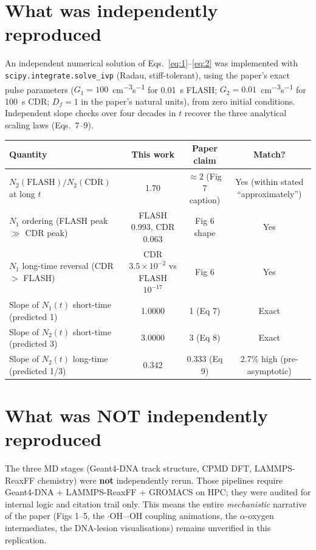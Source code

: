 \documentclass[11pt]{article}
\begin{document}
\section{What was independently reproduced}
An independent numerical solution of Eqs.~\ref{eq:1}--\ref{eq:2} was implemented with \texttt{scipy.integrate.solve\_ivp} (Radau, stiff-tolerant), using the paper's exact pulse parameters ($G_1=100$~cm\textsuperscript{$-3$}s\textsuperscript{$-1$} for 0.01~s FLASH; $G_2=0.01$~cm\textsuperscript{$-3$}s\textsuperscript{$-1$} for 100~s CDR; $D_f=1$ in the paper's natural units), from zero initial conditions. Independent slope checks over four decades in $t$ recover the three analytical scaling laws (Eqs.~7--9).

\begin{longtable}{lccc}
\toprule
\textbf{Quantity} & \textbf{This work} & \textbf{Paper claim} & \textbf{Match?} \\
\midrule
$N_2(\text{FLASH})/N_2(\text{CDR})$ at long $t$ & 1.70 & $\approx 2$ (Fig 7 caption) & Yes (within stated ``approximately'') \\
$N_1$ ordering (FLASH peak $\gg$ CDR peak) & FLASH 0.993, CDR 0.063 & Fig 6 shape & Yes \\
$N_1$ long-time reversal (CDR $>$ FLASH) & CDR $3.5\!\times\!10^{-2}$ vs FLASH $10^{-17}$ & Fig 6 & Yes \\
Slope of $N_1(t)$ short-time (predicted 1) & 1.0000 & 1 (Eq 7) & Exact \\
Slope of $N_2(t)$ short-time (predicted 3) & 3.0000 & 3 (Eq 8) & Exact \\
Slope of $N_2(t)$ long-time (predicted 1/3) & 0.342 & 0.333 (Eq 9) & 2.7\% high (pre-asymptotic) \\
\bottomrule
\end{longtable}

\section{What was NOT independently reproduced}
The three MD stages (Geant4-DNA track structure, CPMD DFT, LAMMPS-ReaxFF chemistry) were \textbf{not} independently rerun. Those pipelines require Geant4-DNA + LAMMPS-ReaxFF + GROMACS on HPC; they were audited for internal logic and citation trail only. This means the entire \emph{mechanistic} narrative of the paper (Figs 1--5, the $\cdot$OH--$\cdot$OH coupling animations, the $\alpha$-oxygen intermediates, the DNA-lesion visualisations) remains unverified in this replication.
\end{document}
